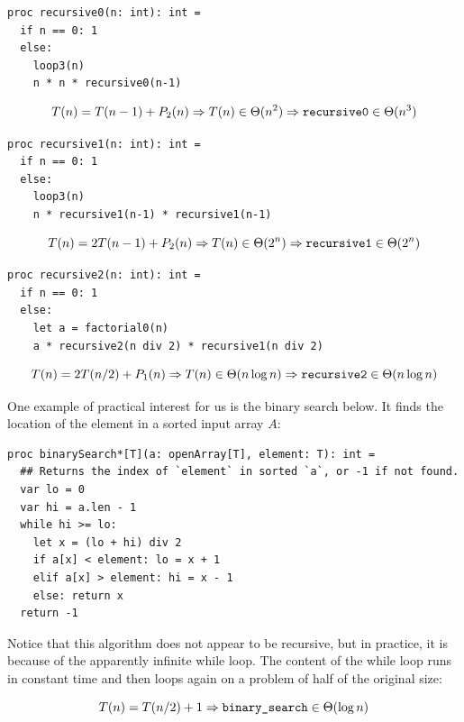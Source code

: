 \documentclass[justified, sixbynine]{tufte-book}
\theoremstyle{plain}%
\newtheorem * {corollary}{Corollary}
\theoremstyle{definition}
\theoremstyle{remark}
\newtheorem * {remark}{Remark}
\newtheorem * {note}{Note}
\begin{document}
\begin{fullwidth}
\begin{lstlisting}
proc recursive0(n: int): int =
  if n == 0: 1
  else:
    loop3(n)
    n * n * recursive0(n-1)
\end{lstlisting}

\begin{equation}
T(n)=T(n-1)+P_2(n)\Rightarrow T(n)\in \Theta (n^2)\Rightarrow \text{{\tt %
recursive0}}\in \Theta (n^3)
\end{equation}

\begin{lstlisting}
proc recursive1(n: int): int =
  if n == 0: 1
  else:
    loop3(n)
    n * recursive1(n-1) * recursive1(n-1)
\end{lstlisting}

\begin{equation}
T(n)=2T(n-1)+P_2(n)\Rightarrow T(n)\in \Theta (2^n)\Rightarrow \text{{\tt %
recursive1}}\in \Theta (2^n)
\end{equation}

\begin{lstlisting}
proc recursive2(n: int): int =
  if n == 0: 1
  else:
    let a = factorial0(n)
    a * recursive2(n div 2) * recursive1(n div 2)
\end{lstlisting}

\begin{equation}
T(n) = 2 T(n/2) + P_1(n) \Rightarrow T(n)\in \Theta (n\log n)\Rightarrow \text{%
{\tt recursive2}}\in \Theta (n\log n)
\end{equation}

One example of practical interest for us is the binary search below. It finds the location of the element in a sorted input array $A$:

\begin{lstlisting}
proc binarySearch*[T](a: openArray[T], element: T): int =
  ## Returns the index of `element` in sorted `a`, or -1 if not found.
  var lo = 0
  var hi = a.len - 1
  while hi >= lo:
    let x = (lo + hi) div 2
    if a[x] < element: lo = x + 1
    elif a[x] > element: hi = x - 1
    else: return x
  return -1
\end{lstlisting}

Notice that this algorithm does not appear to be recursive, but in practice, it is because of the apparently infinite while loop. The content of the while loop runs in constant time and then loops again on a problem of half of the original size:

\begin{equation}
T(n)=T(n/2)+1\Rightarrow \text{{\tt binary\_search}}\in \Theta(\log n)
\end{equation}


\end{fullwidth}
\end{document}
